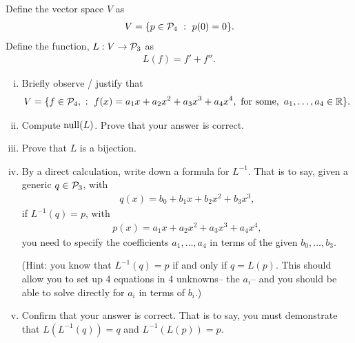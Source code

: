 \begin{question}\label{que:PrimePlusPrimePrime}
    \normalfont
    Define the vector space $V$ as
    \begin{align*}
        V = \{ p\in\P_4\ :\ p(0)=0 \}.
    \end{align*}
    Define the function, $L:V\to\P_3$ as
    \begin{align*}
        L(f) = f'+f''.
    \end{align*}

    \begin{enumerate}[(i)]
        \item Briefly observe / justify that
              \begin{align*}
                  V = \{ f\in\P_4,\ :\ f(x) = a_1x + a_2x^2 +a_3x^3 + a_4 x^4,\ \text{for some},\ a_1,\dots,a_4 \in\real\}.
              \end{align*}

        \item Compute $\NullLA(L)$.  Prove that your answer is correct.

        \item Prove that $L$ is a bijection.

        \item By a direct calculation, write down a formula for $L^{-1}$.  That is to say, given a generic $q\in \P_3$, with
              \begin{align*}
                  q(x)= b_0 + b_1x + b_2x^2 + b_3x^3,
              \end{align*}
              if $L^{-1}(q)=p$, with
              \begin{align*}
                  p(x) = a_1x + a_2x^2 +a_3x^3 + a_4 x^4,
              \end{align*}
              you need to specify the coefficients $a_1,\dots, a_4$ in terms of the given $b_0,\dots, b_3$.

              (Hint: you know that $L^{-1}(q)=p$ if and only if $q=L(p)$.  This should allow you to set up 4 equations in 4 unknowns-- the $a_i$-- and you should be able to solve directly for $a_i$ in terms of $b_i$.)

        \item Confirm that your answer is correct.  That is to say, you must demonstrate that $L(L^{-1}(q))=q$ and $L^{-1}(L(p))=p$.

    \end{enumerate}


\end{question}
